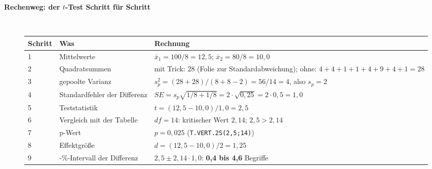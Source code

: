 \begin{description}
\item[{\rot\bf Rechenweg: der $t$-Test Schritt für Schritt}]~\\
\begin{center}
\small
\begin{tabular}{@{}l>{\raggedright\arraybackslash}p{}>{\raggedright\arraybackslash}p{}@{}}
\toprule
\textbf{Schritt} & \textbf{Was} & \textbf{Rechnung} \\
\midrule
1 & Mittelwerte & $\bar{x}_1=100/8=12{,}5$; \quad $\bar{x}_2=80/8=10{,}0$ \\
2 & Quadratsummen & mit Trick: 28 (Folie zur Standardabweichung); ohne: $4+4+1+1+4+9+4+1=28$ \\
3 & gepoolte Varianz & $s_p^2=(28+28)/(8+8-2)=56/14=4$, also $s_p=2$ \\
4 & Standardfehler der Differenz & $\mathit{SE}=s_p\sqrt{1/8+1/8}=2\cdot\sqrt{0{,}25}=2\cdot0{,}5=1{,}0$ \\
5 & Teststatistik & $t=(12{,}5-10{,}0)/1{,}0=2{,}5$ \\
6 & Vergleich mit der Tabelle & $\mathit{df}=14$: kritischer Wert $2{,}14$; $2{,}5>2{,}14$ \\
7 & p-Wert & $p=0{,}025$ \quad (\texttt{T.VERT.2S(2,5;14)}) \\
8 & Effektgröße & $d=(12{,}5-10{,}0)/2=1{,}25$ \\
9 & 95-\%-Intervall der Differenz & $2{,}5\pm2{,}14\cdot1{,}0$: \textbf{0,4 bis 4,6} Begriffe \\
\bottomrule
\end{tabular}
\end{center}
\os{\newpage}


\end{description}
